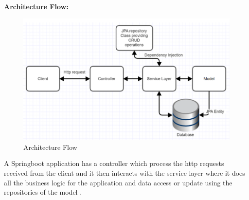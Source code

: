     \textbf{ \large Architecture Flow:}
     \begin{figure}[h!]
     \begin{center}
          \includegraphics[scale=0.8]{images/Flow.PNG}
           \centering \caption{Architecture Flow}
    \end{center}
    \end{figure}
    \newline
    A Springboot application has a controller which process the http requests received from the client and it then interacts with the service layer where it does all the business logic for the application and data access or update using the repositories of the model \cite{springboot2020}. 
    
